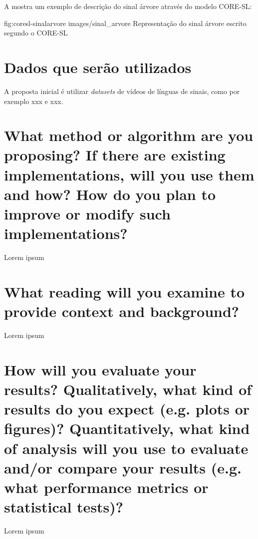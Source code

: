 A  mostra um exemplo de descrição do sinal árvore através do modelo CORE-SL:

\image
    {fig:coresl-sinalarvore}
    {images/sinal_arvore}
    {Representação do sinal árvore escrito segundo o CORE-SL}
    

\section{Dados que serão utilizados}
A proposta inicial é utilizar \textit{datasets} de vídeos de línguas de sinais, como por exemplo xxx e xxx.

\section{What method or algorithm are you proposing? If there are existing implementations, will you use them and how? How do you plan to improve or modify such implementations?}
Lorem ipsum

\section{What reading will you examine to provide context and background?}
Lorem ipsum

\section{How will you evaluate your results? Qualitatively, what kind of results do you expect (e.g. plots or figures)? Quantitatively, what kind of analysis will you use to evaluate and/or compare your results (e.g. what performance metrics or statistical tests)?}
Lorem ipsum


\printbibliography


